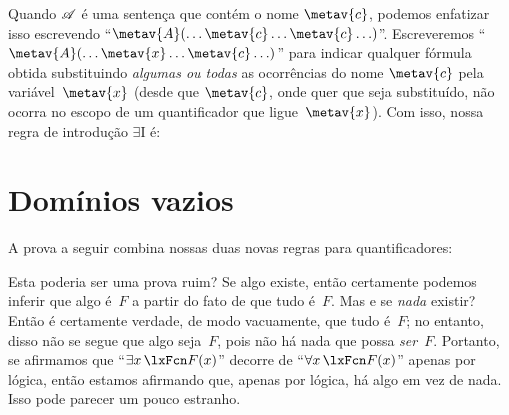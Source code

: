 Quando $\mathscr{A}$ é uma sentença que contém o nome $\metav{c}$,
podemos enfatizar isso escrevendo
\textquotedblleft $\metav{A}(\ldots \metav{c} \ldots \metav{c}\ldots)$\textquotedblright{}. Escreveremos
\textquotedblleft $\metav{A}(\ldots \metav{x} \ldots \metav{c}\ldots)$\textquotedblright{} para indicar qualquer fórmula obtida substituindo
\emph{algumas ou todas} as ocorrências do nome $\metav{c}$ pela
variável~$\metav{x}$ (desde que $\metav{c}$, onde quer que seja
substituído, não ocorra no escopo de um quantificador que
ligue~$\metav{x}$). Com isso, nossa regra de introdução
$\exists$I é:

\section{Domínios vazios}
A prova a seguir combina nossas duas novas regras para quantificadores:
	\begin{fitchproof}
		\PR
	\end{fitchproof}
Esta poderia ser uma prova ruim? Se algo existe, então certamente podemos inferir que algo é~$F$ a partir do fato de que tudo é~$F$. Mas e se \emph{nada} existir? Então é certamente verdade, de modo vacuamente, que tudo é~$F$; no entanto, disso não se segue que algo seja~$F$, pois não há nada que possa \emph{ser}~$F$. Portanto, se afirmamos que \textquotedblleft $\exists x\,\atom{F}{x}$\textquotedblright{} decorre de \textquotedblleft $\forall x\,\atom{F}{x}$\textquotedblright{} apenas por lógica, então estamos afirmando que, apenas por lógica, há algo em vez de nada. Isso pode parecer um pouco estranho.


